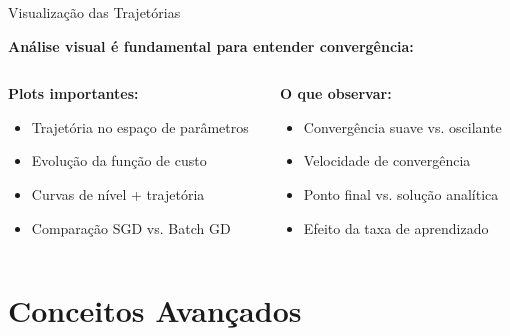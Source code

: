 \documentclass[xcolor=dvipsnames,t,aspectratio=169]{beamer} %
\begin{document}
\begin{frame}[c]{Visualização das Trajetórias}
    
    \textbf{Análise visual é fundamental para entender convergência:}
        \vspace{0.5cm}

    \begin{columns}[c]
        \begin{column}{0.5\textwidth}
            \textbf{Plots importantes:}
            \begin{itemize}
                \item Trajetória no espaço de parâmetros
                \item Evolução da função de custo
                \item Curvas de nível + trajetória
                \item Comparação SGD vs. Batch GD
            \end{itemize}
        \end{column}
        \begin{column}{0.5\textwidth}
            \textbf{O que observar:}
            \begin{itemize}
                \item Convergência suave vs. oscilante
                \item Velocidade de convergência
                \item Ponto final vs. solução analítica
                \item Efeito da taxa de aprendizado
            \end{itemize}
        \end{column}
    \end{columns}
    

\end{frame}

\section{Conceitos Avançados}
\end{document}
